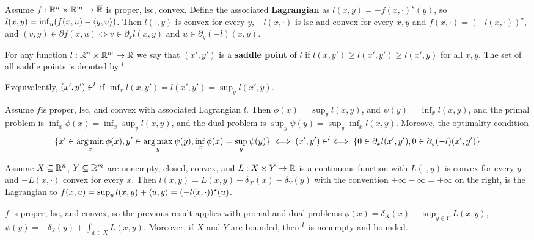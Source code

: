 \begin{thm}
  \label{sec:duality-optimization-8}
  Assume $f: \mathbb{R}^{n} \times \mathbb{R}^{m} \rightarrow \overline {\mathbb{R}}$ is proper,
  lsc, convex.  Define the associated \textbf{Lagrangian} as $l(x, y)
  = -f(x, \cdot)^{\star}(y)$, so $l(x, y) = \inf_{u}(f(x, u) - \IP{y,
    u})$.  Then $l(\cdot, y)$ is convex for every $y$, $-l(x, \cdot)$
  is lsc and convex for every $x, y$ and $f(x, \cdot) = (-l(x,
  \cdot))^{\star}$, and $(v, y) \in \partial f(x, u) \iff v
  \in \partial_{x} l(x, y) \text{ and } u \in \partial_{y}(-l)(x, y)$.
\end{thm}

\begin{defn}
  \label{sec:duality-optimization-9}
  For any function $l: \mathbb{R}^{n} \times \mathbb{R}^{m} \rightarrow \overline {\mathbb{R}}$
  we say that $(x', y')$ is a \textbf{saddle point} of $l$ if $l(x,
  y') \geq l(x', y') \geq l(x', y)$ for all $x, y$. The set of all
  saddle points is denoted by $\sp l$.

  Evquivalently, $(x', y') \in \sp l$ if $\inf_{x} l(x, y') = l(x',
  y') = \sup_{y} l(x', y)$.
\end{defn}

\begin{thm}
  \label{sec:duality-optimization-10}
  Assume $f$is proper, lsc, and convex with associated Lagrangian $l$.
  Then $\phi(x) = \sup_{y} l(x, y)$, and $\psi(y) = \inf_{x} l(x, y)$,
  and the primal problem is $\inf_{x} \phi(x) = \inf_{x} \sup_{y} l(x,
  y)$, and the dual problem is $\sup_{y} \psi(y) = \sup_{y} \inf_{x}
  l(x, y)$.  Moreove, the optimality condition
  \begin{align}
    \label{eq:49}
    \{ x' \in \operatorname*{arg\,min}_{x} \phi(x), y' \in \operatorname*{arg\,max}_{y} \psi(y),
    \inf_{x} \phi(x) = \sup_{y} \psi(y) \}  \iff (x', y') \in \sp l
    \iff \{ 0 \in \partial_{x} l(x', y'), 0 \in \partial_{y}(-l)(x', y') \}
  \end{align}
\end{thm}

\begin{thm}
  \label{sec:duality-optimization-11}
  Assume $X \subseteq \mathbb{R}^{n}$, $Y \subseteq \mathbb{R}^{m}$ are nonempty,
  closed, convex, and $L: X \times Y \rightarrow \mathbb{R}$ is a continuous
  function with $L(\cdot, y)$ is convex for every $y$ and $-L(x,
  \cdot)$ convex for every $x$.  Then $l(x, y) = L(x, y) +
  \delta_{X}(x) - \delta_{Y}(y)$ with the convention $+\infty - \infty
  = +\infty$ on the right, is the Lagrangian to $f(x, u) = \sup_{y}
  l(x, y) + \IP{u, y} = (-l(x, \cdot))^{\star}(u)$.

  $f$ is proper, lsc, and convex, so the previous result applies with
  promal and dual problems $\phi(x) = \delta_{X}(x) + \sup_{y \in Y}
  L(x, y)$, $\psi(y) = -\delta_{Y}(y) + \int_{x \in X} L(x, y)$.
  Moreover, if $X$ and $Y$ are bounded, then $\sp l$ is nonempty and bounded.
\end{thm}


